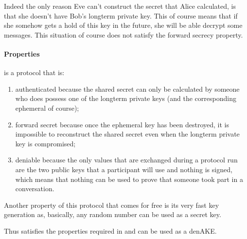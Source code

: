 Indeed the only reason Eve can't construct the secret that Alice calculated, is
that she doesn't have Bob's longterm private key. This of course means that if
she somehow gets a hold of this key in the future, she will be able decrypt some messages. This situation of course does not satisfy the forward secrecy property.


\paragraph{Properties}
\tdhname is a protocol that is:

\begin{enumerate}

  \item authenticated because the shared secret can only be calculated by someone who does possess one of the longterm private keys (and the corresponding ephemeral of course);

  \item forward secret because once the ephemeral key has been destroyed, it is impossible to reconstruct the shared secret even when the longterm private key is compromised;

  \item deniable because the only values that are exchanged during a protocol run are the two public keys that a participant will use and nothing is signed, which means that nothing can be used to prove that someone took part in a conversation.

\end{enumerate}

Another property of this protocol that comes for free is its very fast key generation
as, basically, any random number can be used as a secret key.

Thus \tdhname satisfies the properties required in \cite{mpotr} and
can be used as a denAKE.

